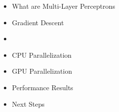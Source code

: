\begin{frame}
\begin{itemize}
    \item What are Multi-Layer Perceptrons
    \item Gradient Descent
    \item \textbf{\color{red}{Code Profiling}}
    \item CPU Parallelization
    \item GPU Parallelization
    \item Performance Results 
    \item Next Steps
\end{itemize}
\end{frame}


